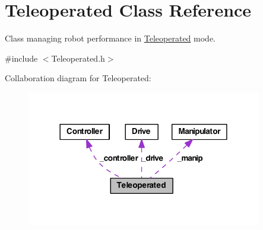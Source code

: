 \hypertarget{class_r_j_f_r_c2011_1_1_teleoperated}{
\section{Teleoperated Class Reference}
\label{class_r_j_f_r_c2011_1_1_teleoperated}
}


Class managing robot performance in \hyperlink{class_r_j_f_r_c2011_1_1_teleoperated}{Teleoperated} mode.  




{\ttfamily \#include $<$Teleoperated.h$>$}



Collaboration diagram for Teleoperated:
\nopagebreak
\begin{figure}[H]
\begin{center}
\leavevmode
\includegraphics[width=290pt]{class_r_j_f_r_c2011_1_1_teleoperated__coll__graph}
\end{center}
\end{figure}
